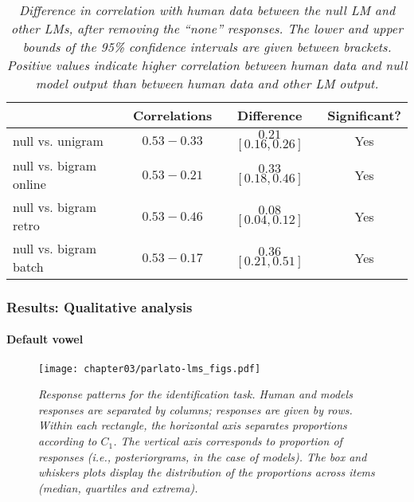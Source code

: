 {%
\begin{table}[ht]
\centering
\caption{\textit{Difference in correlation with human data between the null LM and other LMs, after removing the ``none'' responses. The lower and upper bounds of the 95\% confidence intervals are given between brackets. Positive values indicate higher correlation between human data and null model output than between human data and other LM output.}}
\label{tab:parlato_lms-cor_diff-nonone}
\vspace{0.25cm}
\begin{tabular}{lccc}
   \toprule
  & Correlations & Difference & Significant? \\  \midrule
null vs. unigram & $0.53 - 0.33$ & $0.21$ $[0.16, 0.26]$ & Yes  \\ 
null vs. bigram online   & $0.53 - 0.21$ & $0.33$ $[0.18, 0.46]$ & Yes \\ 
null vs. bigram retro    & $0.53 - 0.46$ & $0.08$ $[0.04, 0.12]$ & Yes \\ 
 null vs. bigram batch    & $0.53 - 0.17$ & $0.36$ $[0.21, 0.51]$ & Yes \\  \bottomrule 
\end{tabular}
\end{table}

\subsubsection{Results: Qualitative analysis}

\paragraph{Default vowel}

\begin{figure}[htb!]
    \centering
    \texttt{[image: chapter03/parlato-lms\_figs.pdf]}
    \caption{\textit{Response patterns for the identification task. Human and models responses are separated by columns; responses are given by rows. Within each rectangle, the horizontal axis separates proportions according to $C_{1}$. The vertical axis corresponds to proportion of responses (i.e., posteriorgrams, in the case of models). The box and whiskers plots display the distribution of the proportions across items (median, quartiles and extrema).}}
    \label{fig:parlato-lms}
  \end{figure}
 
}
